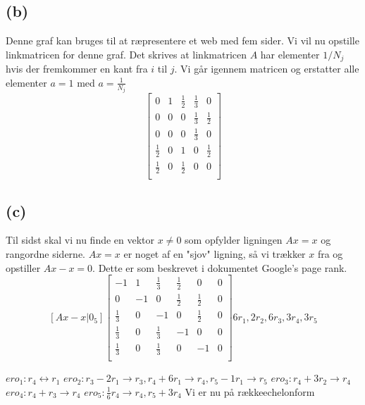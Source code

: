 \documentclass[a4paper,fleqn]{article}
\begin{document}
	\subsection{(b)}
	Denne graf kan bruges til at ræpresentere et web med fem sider. Vi vil nu opstille
	linkmatricen for denne graf. Det skrives at linkmatricen $A$ har elementer $1/N_j$ hvis der
	fremkommer en kant fra $i$ til $j$. Vi går igennem matricen og erstatter alle elementer
	$a = 1$ med $a = \frac{1}{N_j}$ \\
	\begin{equation}
		\begin{bmatrix}
			0&1&\frac{1}{2}&\frac{1}{3}&0\\
			0&0&0&\frac{1}{3}&\frac{1}{2}\\
			0&0&0&\frac{1}{3}&0\\
			\frac{1}{2}&0&1&0&\frac{1}{2}\\
			\frac{1}{2}&0&\frac{1}{2}&0&0\\
		\end{bmatrix}
	\end{equation}

	\subsection{(c)}
	Til sidst skal vi nu finde en vektor $x \neq 0$ som opfylder ligningen $Ax = x$ og
	rangordne siderne. $Ax = x$ er noget af en "sjov" ligning, så vi trækker $x$ fra og
	opstiller $Ax - x = 0$. Dette er som beskrevet i dokumentet Google's page rank.\\
\[[Ax - x|0_5]\left[\begin{array}{ccccc|c}
	-1		&1	&\frac{1}{3}	&\frac{1}{2}	&0 		&0\\
	0		&-1 	&0		&\frac{1}{2}	&\frac{1}{2}	&0\\
	\frac{1}{3}	&0	&-1		&0		&\frac{1}{2}	&0\\
	\frac{1}{3}	&0	&\frac{1}{3}	&-1		&0		&0\\
	\frac{1}{3}	&0	&\frac{1}{3}	&0		&-1		&0\\
\end{array}\right]6r_1, 2r_2, 6r_3, 3r_4, 3r_5\]

$ero_1: r_4 \leftrightarrow r_1$
$ero_2: r_3 - 2r_1 \rightarrow r_3, r_4 + 6r_1 \rightarrow r_4, r_5 -1r_1\rightarrow r_5$
$ ero_3: r_4 + 3r_2 \rightarrow r_4$
$ero_4: r_4 + r_3 \rightarrow r_4$ 
$ ero_5: \frac{1}{6}r_4 \rightarrow r_4, r_5 + 3r_4 $
	Vi er nu på rækkeechelonform\\
\end{document}
